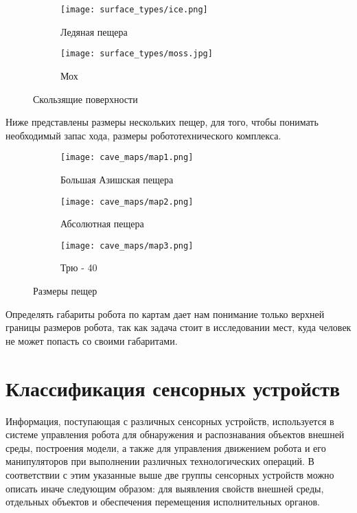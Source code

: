 \begin{figure}[H]
\begin{subfigure}{0.49\textwidth}
\centering\texttt{[image: surface\_types/ice.png]}\\
\caption{Ледяная пещера}
\label{fig:icee}
\end{subfigure}
\begin{subfigure}{0.49\textwidth}
\centering\texttt{[image: surface\_types/moss.jpg]}\\
\caption{Мох}
\label{fig:moss}
\end{subfigure}
\caption{Скользящие поверхности}
\label{fig:slippery_surfaces}
\end{figure}

Ниже представлены размеры нескольких пещер, для того, чтобы понимать необходимый запас хода, размеры робототехнического комплекса.

\begin{figure}[H]
\begin{subfigure}{0.8\textwidth}
\centering\texttt{[image: cave\_maps/map1.png]}\\
\caption{Большая Азишская пещера}
\label{fig:ice}
\end{subfigure}
\begin{subfigure}{0.8\textwidth}
\centering\texttt{[image: cave\_maps/map2.png]}\\
\caption{Абсолютная пещера}
\end{subfigure}
\begin{subfigure}{0.8\textwidth}
\centering\texttt{[image: cave\_maps/map3.png]}\\
\caption{Трю - 40}
\end{subfigure}
\caption{Размеры пещер}
\end{figure}

Определять габариты робота по картам дает нам понимание только верхней границы размеров робота, так как задача стоит в исследовании мест, куда человек не может попасть со своими габаритами.



\section{Классификация сенсорных устройств}
Информация, поступающая с различных сенсорных устройств, используется в системе управления робота для обнаружения и распознавания объектов внешней среды, построения модели, а также для управления движением робота и его манипуляторов при выполнении различных технологических операций. В соответствии с этим указанные выше две группы сенсорных устройств можно описать иначе следующим образом: для выявления свойств внешней среды, отдельных объектов и обеспечения перемещения исполнительных органов.

